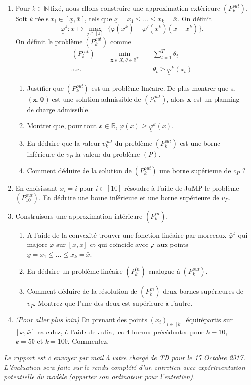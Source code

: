 \documentclass[10pt]{article}
\def\x{\mathbf{x}}
\def\R{\mathbb{R}}
\def\btheta{\boldsymbol{\theta}}
\begin{document}
\begin{enumerate}[resume]
	\item Pour $k\in\mathbb{N}$ fixé, nous allons construire une approximation extérieure $(P^{out}_k)$. Soit $k$ réels $x_i\in [\underline{x},\bar{x}]$, tels que $\underline{x} = x_1 \leq \dots \leq x_k = \bar{x}$. On définit
		$$ \underline{\varphi}^k : x \mapsto \max_{j\in[k]} \; \{\varphi(x^k) + \varphi'(x^k)(x-x^k)\}.$$
		On définit le problème $(P^{out}_k)$ comme
		\begin{align*}
		(P^{out}_k) \qquad \min_{\x \in X, \theta \in \R^T} \quad & \sum_{t=1}^T \theta_t \\
		\mbox{s.c.} \quad & \theta_t \geq \underline{\varphi}^k(x_t)
		\end{align*}
	\begin{enumerate}
		\item Justifier que $(P^{out}_k)$ est un problème linéaire. De plus montrer que si $(\x, \btheta)$ est une solution admissible de $(P^{out}_k)$, alors $\x$ est un planning de charge admissible.
		\item Montrer que, pour tout $x \in \R$, $\varphi(x) \geq \underline{\varphi}^k(x)$.
		\item En déduire que la valeur $v^{out}_k$ du problème $(P^{out}_k)$ est une borne inférieure de $v_P$ la valeur du problème $(P)$.
		\item Comment déduire de la solution de $(P^{out}_k)$ une borne supérieure de $v_P$ ?
	\end{enumerate}
	\item En choisissant $x_i = i$ pour $i\in [10]$ résoudre à l'aide de JuMP le problème $(P^{out}_{10})$. En déduire une borne inférieure et une borne supérieure de $v_P$.
	\item Construisons une approximation intérieure $(P^{in}_k)$.
	\begin{enumerate}
		\item A l'aide de la convexité trouver une fonction linéaire par morceaux $\bar{\varphi}^k$ qui majore $\varphi$ sur $[\underline{x},\bar{x}]$ et qui coïncide avec $\varphi$ aux points $\underline{x} = x_1 \leq \dots \leq x_k = \bar{x}$.
		\item En déduire un problème linéaire $(P^{in}_k)$ analogue à $(P^{out}_k)$.
		\item Comment déduire de la résolution de $(P^{in}_k)$ deux bornes supérieures de $v_P$. Montrez que l'une des deux est supérieure à l'autre.
	\end{enumerate}
	\item {\em (Pour aller plus loin)} En prenant des points $(x_i)_{i\in[k]}$ équirépartis sur $[\underline{x},\bar{x}]$ calculez, à l'aide de Julia, les 4 bornes précédentes pour $k=10$, $k=50$ et $k=100$. Commentez.
\end{enumerate}


{\em Le rapport est à envoyer par mail à votre chargé de TD pour le 17
Octobre 2017. L'évaluation sera faite sur le rendu complété d'un entretien
avec expérimentation potentielle du modèle (apporter son ordinateur pour
l'entretien).}
\end{document}
